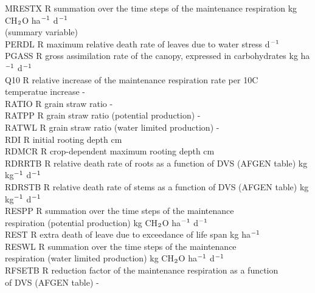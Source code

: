 \begin{tabbing}
MRESTX\> \> R\> summation over the time steps of the maintenance respiration\> \> \> \> \> \> \> kg CH$_{{\rm 2}}$O ha$^{{\rm -1}}$ d$^{{\rm -1}}$\\
\>\> \> (summary variable)\\
PERDL\> \> R\> maximum relative death rate of leaves due to water stress\> \> \> \> \> \> \> d$^{{\rm -1}}$\\
PGASS   \> \> R   \> gross assimilation rate of the canopy, expressed in carbohydrates   \> \> \> \> \> \> \> kg ha$^{{\rm -1}}$ d$^{{\rm -1}}$\\
Q10\> \> R\> relative increase of the maintenance respiration rate per 10\degrees C\\
\>\> \> temperatue increase \> \> \> \> \> \> \> -\\
RATIO\> \> R\> grain straw ratio\> \> \> \> \> \> \> -\\
RATPP\> \> R\> grain straw ratio (potential production)\> \> \> \> \> \> \> -\\
RATWL\> \> R\> grain straw ratio (water limited production)\> \> \> \> \> \> \> -\\
RDI\> \> R\> initial rooting depth\> \> \> \> \> \> \> cm\\
RDMCR\> \> R\> crop-dependent maximum rooting depth\> \> \> \> \> \> \> cm\\
RDRRTB\> \> R\> relative death rate of roots as a function of DVS (AFGEN table)\> \> \> \> \> \> \> kg kg$^{{\rm -1}}$ d$^{{\rm -1}}$\\
RDRSTB\> \> R\> relative death rate of stems as a function of DVS (AFGEN table)\> \> \> \> \> \> \> kg kg$^{{\rm -1}}$ d$^{{\rm -1}}$\\
RESPP\> \> R\> summation over the time steps of the maintenance \\
\>\> \> respiration (potential production)\> \> \> \> \> \> \> kg CH$_{{\rm 2}}$O ha$^{{\rm -1}}$ d$^{{\rm -1}}$\\
REST\> \> R\> extra death of leave due to exceedance of life span\> \> \> \> \> \> \> kg ha$^{{\rm -1}}$\\
RESWL\> \> R\> summation over the time steps of the maintenance \\
\>\> \> respiration (water limited production)\> \> \> \> \> \> \> kg CH$_{{\rm 2}}$O ha$^{{\rm -1}}$ d$^{{\rm -1}}$\\
RFSETB\> \> R\> reduction factor of the maintenance respiration as a function \\
\>\> \> of DVS (AFGEN table)\> \> \> \> \> \> \> -\\

\end{tabbing}
